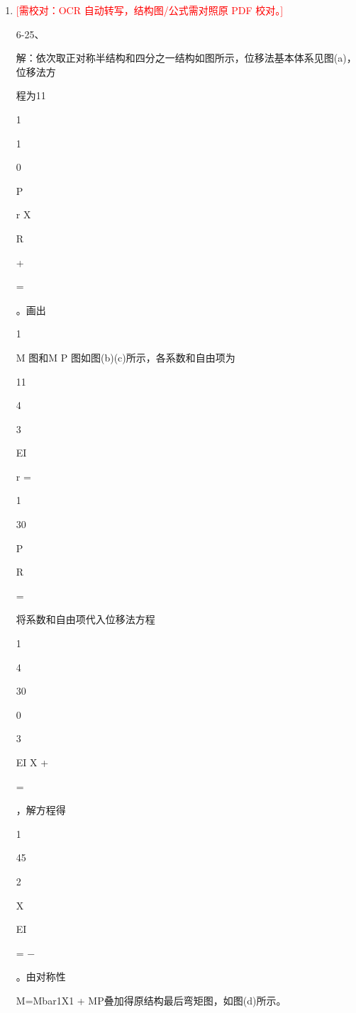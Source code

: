 \documentclass[UTF8,12pt,a4paper,openany]{ctexbook}
\newcommand{\TODO}[1]{\textcolor{red}{[需校对：#1]}}
\begin{document}
\begin{enumerate}[label=\textbf{\arabic*.},leftmargin=2em]
\item \TODO{OCR 自动转写，结构图/公式需对照原 PDF 校对。}\par 6-25、\par 解：依次取正对称半结构和四分之一结构如图所示，位移法基本体系见图(a)，位移法方\par 程为11\par 1\par 1\par 0\par P\par r X\par R\par +\par =\par 。画出\par 1\par M 图和M P 图如图(b)(c)所示，各系数和自由项为\par 11\par 4\par 3\par EI\par r =\par 1\par 30\par P\par R\par =\par 将系数和自由项代入位移法方程\par 1\par 4\par 30\par 0\par 3\par EI X +\par =\par ，解方程得\par 1\par 45\par 2\par X\par EI\par = −\par 。由对称性\par M=Mbar1X1 + MP叠加得原结构最后弯矩图，如图(d)所示。

\end{enumerate}
\end{document}
